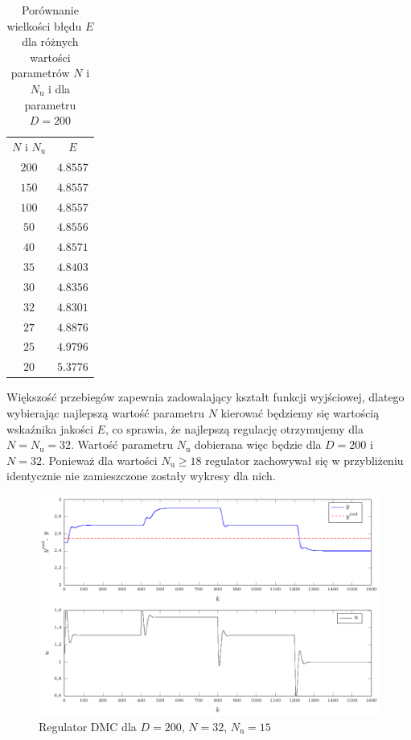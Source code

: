 \begin{table}
	[b] \caption{Porównanie wielkości błędu $E$ dla różnych wartości parametrów $N$ i $N_{\mathrm{u}}$ i dla parametru $D=200$}
	\label{t_T_i}
	\centering
	\begin{small}
		\begin{tabular}{|c|c|}
			\hline
			$N$ i $N_{\mathrm{u}}$	&	$E$	\\
			$200$	&	$\num{4.8557}$		\\
			$150$ 	&	$\num{4.8557}$		\\
			$100$ 	&	$\num{4.8557}$ 		\\
			$50$ 	&	$\num{4.8556}$		\\
			$40$	&	$\num{4.8571}$	\\
			$35$	&	$\num{4.8403}$	\\
			$30$	&	$\num{4.8356}$	\\
			$32$	&	$\num{4.8301}$	\\
			$27$	&	$\num{4.8876}$	\\
			$25$	&	$\num{4.9796}$	\\
			$20$	&	$\num{5.3776}$	\\
			\hline
			\end{tabular}
	\end{small}
\end{table}

Większość przebiegów zapewnia zadowalający kształt funkcji wyjściowej, dlatego wybierając najlepszą wartość parametru $N$ kierować będziemy się wartością wskaźnika jakości $E$, co sprawia, że najlepszą regulację otrzymujemy dla $N=N_{\mathrm{u}}=32$. Wartość parametru $N_{\mathrm{u}}$ dobierana więc będzie dla $D=200$ i $N=32$. Ponieważ dla wartości $N_{\mathrm{u}}\ge{18}$ regulator zachowywał się w przybliżeniu identycznie nie zamieszczone zostały wykresy dla nich.

\begin{figure}[tb] 
\centering 
\includegraphics[scale=1]{rysunki/zapisz_pdf/DMC_D=200.000_N=32.00_Nu=15.00.pdf} 
\caption{Regulator DMC dla $D=200$, $N=32$, $N_{\mathrm{u}}=15$} 
\label{r_pgfplots_DMC_D=200.000_N=32.00_Nu=15.00} 
\end{figure}

